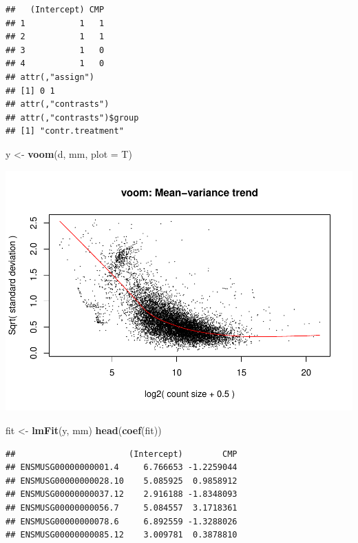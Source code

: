 \documentclass[
]{article}
\newenvironment{Shaded}{\begin{snugshade}}{\end{snugshade}}
\newcommand{\AttributeTok}[1]{\textcolor[rgb]{0.13,0.29,0.53}{#1}}
\newcommand{\FunctionTok}[1]{\textcolor[rgb]{0.13,0.29,0.53}{\textbf{#1}}}
\newcommand{\NormalTok}[1]{#1}
\newcommand{\OtherTok}[1]{\textcolor[rgb]{0.56,0.35,0.01}{#1}}
\begin{document}
\begin{verbatim}
##   (Intercept) CMP
## 1           1   1
## 2           1   1
## 3           1   0
## 4           1   0
## attr(,"assign")
## [1] 0 1
## attr(,"contrasts")
## attr(,"contrasts")$group
## [1] "contr.treatment"
\end{verbatim}

\begin{Shaded}
\begin{Highlighting}[]
\NormalTok{y }\OtherTok{\textless{}{-}} \FunctionTok{voom}\NormalTok{(d, mm, }\AttributeTok{plot =}\NormalTok{ T)}
\end{Highlighting}
\end{Shaded}

\includegraphics{RNA_Analysis_23_files/figure-latex/limma voom-1.pdf}

\begin{Shaded}
\begin{Highlighting}[]
\NormalTok{fit }\OtherTok{\textless{}{-}} \FunctionTok{lmFit}\NormalTok{(y, mm)}
\FunctionTok{head}\NormalTok{(}\FunctionTok{coef}\NormalTok{(fit))}
\end{Highlighting}
\end{Shaded}

\begin{verbatim}
##                       (Intercept)        CMP
## ENSMUSG00000000001.4     6.766653 -1.2259044
## ENSMUSG00000000028.10    5.085925  0.9858912
## ENSMUSG00000000037.12    2.916188 -1.8348093
## ENSMUSG00000000056.7     5.084557  3.1718361
## ENSMUSG00000000078.6     6.892559 -1.3288026
## ENSMUSG00000000085.12    3.009781  0.3878810
\end{verbatim}
\end{document}
